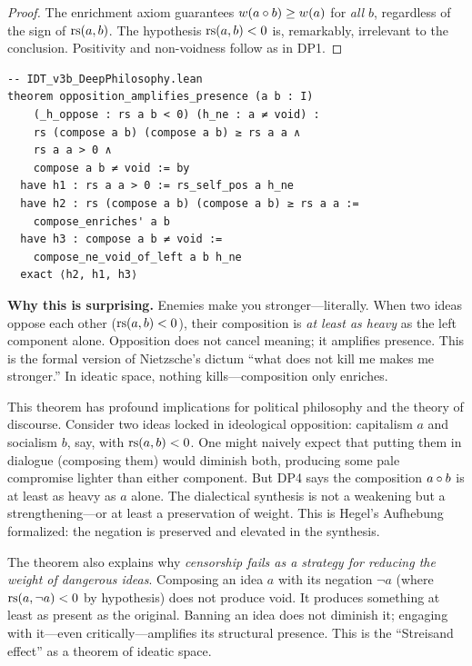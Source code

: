 \begin{proof}
The enrichment axiom guarantees $w(a \circ b) \geq w(a)$ for
\emph{all} $b$, regardless of the sign of $\mathrm{rs}(a, b)$. The hypothesis
$\mathrm{rs}(a, b) < 0$ is, remarkably, irrelevant to the conclusion. Positivity
and non-voidness follow as in DP1.
\end{proof}

\begin{lstlisting}
-- IDT_v3b_DeepPhilosophy.lean
theorem opposition_amplifies_presence (a b : I)
    (_h_oppose : rs a b < 0) (h_ne : a ≠ void) :
    rs (compose a b) (compose a b) ≥ rs a a ∧
    rs a a > 0 ∧
    compose a b ≠ void := by
  have h1 : rs a a > 0 := rs_self_pos a h_ne
  have h2 : rs (compose a b) (compose a b) ≥ rs a a :=
    compose_enriches' a b
  have h3 : compose a b ≠ void :=
    compose_ne_void_of_left a b h_ne
  exact ⟨h2, h1, h3⟩
\end{lstlisting}

\begin{surprisebox}
\textbf{Why this is surprising.} Enemies make you stronger---literally.
When two ideas oppose each other ($\mathrm{rs}(a,b) < 0$), their composition is
\emph{at least as heavy} as the left component alone. Opposition does
not cancel meaning; it amplifies presence. This is the formal version of
Nietzsche's dictum ``what does not kill me makes me stronger.'' In
ideatic space, nothing kills---composition only enriches.
\end{surprisebox}

This theorem has profound implications for political philosophy and the
theory of discourse. Consider two ideas locked in ideological
opposition: capitalism $a$ and socialism $b$, say, with
$\mathrm{rs}(a, b) < 0$. One might naively expect that putting them in dialogue
(composing them) would diminish both, producing some pale compromise
lighter than either component. But DP4 says the composition
$a \circ b$ is at least as heavy as $a$ alone. The dialectical
synthesis is not a weakening but a strengthening---or at least a
preservation of weight. This is Hegel's Aufhebung formalized: the
negation is preserved and elevated in the synthesis.

The theorem also explains why \emph{censorship fails as a strategy for
reducing the weight of dangerous ideas}. Composing an idea $a$ with its
negation $\neg a$ (where $\mathrm{rs}(a, \neg a) < 0$ by hypothesis) does not
produce void. It produces something at least as present as the original.
Banning an idea does not diminish it; engaging with it---even
critically---amplifies its structural presence. This is the
``Streisand effect'' as a theorem of ideatic space.

